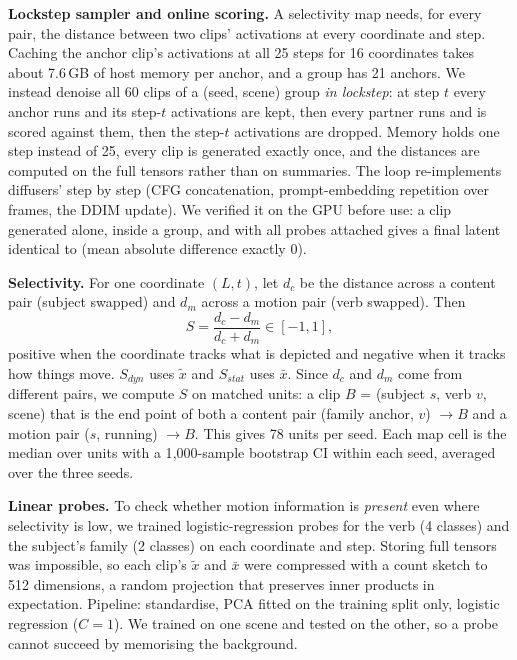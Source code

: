 \documentclass[twoside,english]{article}
\newcommand{\xs}{\bar{x}}         %
\newcommand{\xd}{\tilde{x}}       %
\begin{document}
\textbf{Lockstep sampler and online scoring.} A selectivity map needs, for every pair, the
distance between two clips' activations at every coordinate and step. Caching the anchor clip's
activations at all 25 steps for 16 coordinates takes about 7.6\,GB of host memory per anchor,
and a group has 21 anchors. We instead denoise all 60 clips of a (seed, scene) group
\emph{in lockstep}: at step $t$ every anchor runs and its step-$t$ activations are kept, then
every partner runs and is scored against them, then the step-$t$ activations are dropped. Memory
holds one step instead of 25, every clip is generated exactly once, and the distances are
computed on the full tensors rather than on summaries. The loop re-implements diffusers'
 step by step (CFG concatenation, prompt-embedding repetition over
frames, the DDIM update). We verified it on the GPU before use: a clip generated alone, inside a
group, and with all probes attached gives a final latent identical to  (mean
absolute difference exactly 0).

\textbf{Selectivity.} For one coordinate $(L,t)$, let $d_c$ be the distance across a content
pair (subject swapped) and $d_m$ across a motion pair (verb swapped). Then
\begin{equation}
S = \frac{d_c - d_m}{d_c + d_m} \in [-1, 1],
\end{equation}
positive when the coordinate tracks what is depicted and negative when it tracks how things move.
$S_{dyn}$ uses $\xd$ and $S_{stat}$ uses $\xs$. Since $d_c$ and $d_m$ come from different pairs,
we compute $S$ on matched units: a clip $B$ = (subject $s$, verb $v$, scene) that is the end point
of both a content pair (family anchor, $v$) $\to B$ and a motion pair ($s$, running) $\to B$. This
gives 78 units per seed. Each map cell is the median over units with a 1{,}000-sample bootstrap
CI within each seed, averaged over the three seeds.

\textbf{Linear probes.} To check whether motion information is \emph{present} even where
selectivity is low, we trained logistic-regression probes for the verb (4 classes) and the
subject's family (2 classes) on each coordinate and step. Storing full tensors was impossible, so
each clip's $\xd$ and $\xs$ were compressed with a count sketch to 512 dimensions, a random
projection that preserves inner products in expectation. Pipeline: standardise, PCA fitted on
the training split only, logistic regression ($C=1$). We trained on one scene and tested on the
other, so a probe cannot succeed by memorising the background.
\end{document}
